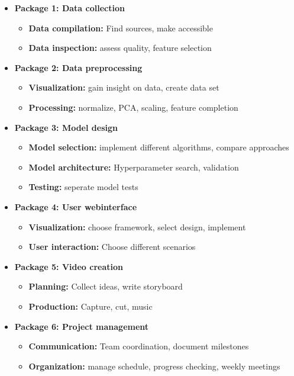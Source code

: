 \documentclass[lang=english,inputenc=utf8,fontsize=10pt]{ldvarticle}
\begin{document}
\begin{itemize}
	\item \textbf{Package 1: Data collection}
		\begin{itemize}
			\item \textbf{Data compilation:} Find sources, make accessible
			\item \textbf{Data inspection:} assess quality, feature selection
		\end{itemize}
	\item \textbf{Package 2: Data preprocessing}
		\begin{itemize}
			\item \textbf{Visualization:} gain insight on data, create data set
			\item \textbf{Processing:} normalize, PCA, scaling, feature completion
		\end{itemize}
	\item \textbf{Package 3: Model design}
		\begin{itemize}
			\item \textbf{Model selection:} implement different algorithms, compare approaches
			\item \textbf{Model architecture:} Hyperparameter search, validation
			\item \textbf{Testing:} seperate model tests
		\end{itemize}
	\item \textbf{Package 4: User webinterface}
		\begin{itemize}
			\item \textbf{Visualization:} choose framework, select design, implement
			\item \textbf{User interaction:} Choose different scenarios
		\end{itemize}
	\item \textbf{Package 5: Video creation}
		\begin{itemize}
			\item \textbf{Planning:} Collect ideas, write storyboard
			\item \textbf{Production:} Capture, cut, music
		\end{itemize}
	\item \textbf{Package 6: Project management}
		\begin{itemize}
			\item \textbf{Communication:} Team coordination, document milestones
			\item \textbf{Organization:} manage schedule, progress checking, weekly meetings
		\end{itemize}
\end{itemize}
\end{document}
